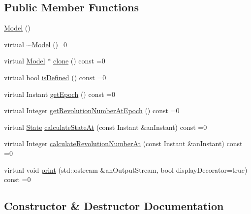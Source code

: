 \subsection*{Public Member Functions}
\begin{DoxyCompactItemize}
\item 
\hyperlink{classostk_1_1astro_1_1trajectory_1_1orbit_1_1_model_a0604b5c1d0c0acb89cb42a10ea0fdb16}{Model} ()
\item 
virtual \hyperlink{classostk_1_1astro_1_1trajectory_1_1orbit_1_1_model_a7593c3eccd08104b00dd4d7c9c6a4d99}{$\sim$\+Model} ()=0
\item 
virtual \hyperlink{classostk_1_1astro_1_1trajectory_1_1orbit_1_1_model}{Model} $\ast$ \hyperlink{classostk_1_1astro_1_1trajectory_1_1orbit_1_1_model_a53dc07564e4c7c444da46360aa8ada15}{clone} () const =0
\item 
virtual bool \hyperlink{classostk_1_1astro_1_1trajectory_1_1orbit_1_1_model_a13c5b5693dd86a072da0bd0e319bacc2}{is\+Defined} () const =0
\item 
virtual Instant \hyperlink{classostk_1_1astro_1_1trajectory_1_1orbit_1_1_model_a22055d5ab4c22e6177a3ddb8f45f1f9b}{get\+Epoch} () const =0
\item 
virtual Integer \hyperlink{classostk_1_1astro_1_1trajectory_1_1orbit_1_1_model_af3f1866f86045da2c05efe4165735cf4}{get\+Revolution\+Number\+At\+Epoch} () const =0
\item 
virtual \hyperlink{classostk_1_1astro_1_1trajectory_1_1_state}{State} \hyperlink{classostk_1_1astro_1_1trajectory_1_1orbit_1_1_model_a34a0d8979ec1f7ade3e434fc0dad3711}{calculate\+State\+At} (const Instant \&an\+Instant) const =0
\item 
virtual Integer \hyperlink{classostk_1_1astro_1_1trajectory_1_1orbit_1_1_model_aeecf4cc22fa9c766801936c468cc52ac}{calculate\+Revolution\+Number\+At} (const Instant \&an\+Instant) const =0
\item 
virtual void \hyperlink{classostk_1_1astro_1_1trajectory_1_1orbit_1_1_model_a8ea45c1a6e51a6153ce3f72f5294f0c6}{print} (std\+::ostream \&an\+Output\+Stream, bool display\+Decorator=true) const =0
\end{DoxyCompactItemize}


\subsection{Constructor \& Destructor Documentation}
\mbox{\label{classostk_1_1astro_1_1trajectory_1_1orbit_1_1_model_a0604b5c1d0c0acb89cb42a10ea0fdb16}} 
